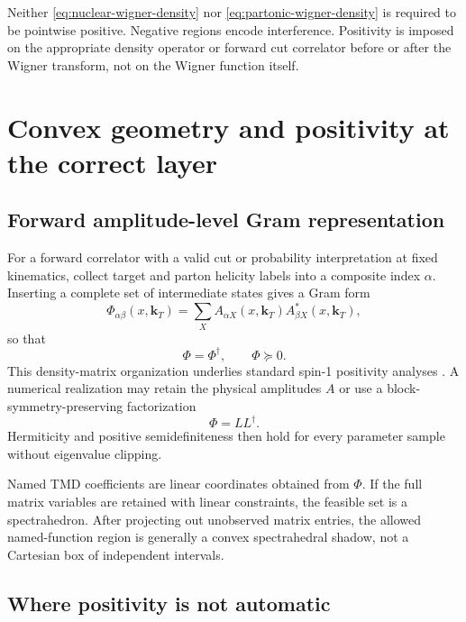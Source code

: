 \documentclass[11pt]{article}
\newcommand{\kT}{\bm{k}_{T}}
\begin{document}
Neither \cref{eq:nuclear-wigner-density} nor
\cref{eq:partonic-wigner-density} is required to be pointwise positive.
Negative regions encode interference.  Positivity is imposed on the
appropriate density operator or forward cut correlator before or after the
Wigner transform, not on the Wigner function itself.

\section{Convex geometry and positivity at the correct layer}
\label{sec:positivity}

\subsection{Forward amplitude-level Gram representation}

For a forward correlator with a valid cut or probability interpretation at
fixed kinematics, collect target and parton helicity labels into a composite
index \(\alpha\).  Inserting a complete set of intermediate states gives a
Gram form
\begin{equation}
 \Phi_{\alpha\beta}(x,\kT)
 =\sum_X A_{\alpha X}(x,\kT)
 A^*_{\beta X}(x,\kT),
\label{eq:gram-correlator}
\end{equation}
so that
\begin{equation}
 \Phi=\Phi^\dagger,
 \qquad
 \Phi\succeq0.
\label{eq:forward-psd}
\end{equation}
This density-matrix organization underlies standard spin-1 positivity analyses \cite{Cotogno2017}.  A numerical realization may retain the physical amplitudes \(A\) or use a
block-symmetry-preserving factorization
\begin{equation}
 \Phi=LL^\dagger.
\label{eq:cholesky-correlator}
\end{equation}
Hermiticity and positive semidefiniteness then hold for every parameter
sample without eigenvalue clipping.

Named TMD coefficients are linear coordinates obtained from \(\Phi\).  If
the full matrix variables are retained with linear constraints, the feasible
set is a spectrahedron.  After projecting out unobserved matrix entries, the
allowed named-function region is generally a convex spectrahedral shadow,
not a Cartesian box of independent intervals.

\subsection{Where positivity is not automatic}
\end{document}
